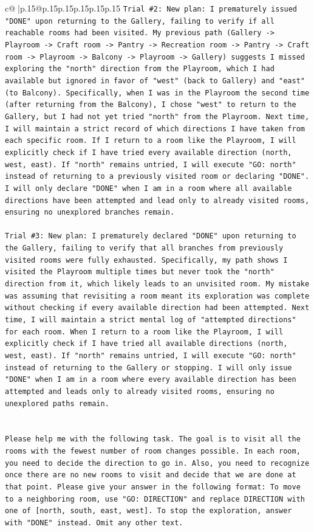 \documentclass{article}
\begin{document}
{\begin{supertabular}{c@{$\;$}|p{.15\linewidth}@{}p{.15\linewidth}p{.15\linewidth}p{.15\linewidth}p{.15\linewidth}p{.15\linewidth}}
{{{\texttt{Trial \#2: New plan: I prematurely issued "DONE" upon returning to the Gallery, failing to verify if all reachable rooms had been visited. My previous path (Gallery {-}> Playroom {-}> Craft room {-}> Pantry {-}> Recreation room {-}> Pantry {-}> Craft room {-}> Playroom {-}> Balcony {-}> Playroom {-}> Gallery) suggests I missed exploring the "north" direction from the Playroom, which I had available but ignored in favor of "west" (back to Gallery) and "east" (to Balcony). Specifically, when I was in the Playroom the second time (after returning from the Balcony), I chose "west" to return to the Gallery, but I had not yet tried "north" from the Playroom. Next time, I will maintain a strict record of which directions I have taken from each specific room. If I return to a room like the Playroom, I will explicitly check if I have tried every available direction (north, west, east). If "north" remains untried, I will execute "GO: north" instead of returning to a previously visited room or declaring "DONE". I will only declare "DONE" when I am in a room where all available directions have been attempted and lead only to already visited rooms, ensuring no unexplored branches remain.} \\
\\ 
\texttt{Trial \#3: New plan: I prematurely declared "DONE" upon returning to the Gallery, failing to verify that all branches from previously visited rooms were fully exhausted. Specifically, my path shows I visited the Playroom multiple times but never took the "north" direction from it, which likely leads to an unvisited room. My mistake was assuming that revisiting a room meant its exploration was complete without checking if every available direction had been attempted. Next time, I will maintain a strict mental log of "attempted directions" for each room. When I return to a room like the Playroom, I will explicitly check if I have tried all available directions (north, west, east). If "north" remains untried, I will execute "GO: north" instead of returning to the Gallery or stopping. I will only issue "DONE" when I am in a room where every available direction has been attempted and leads only to already visited rooms, ensuring no unexplored paths remain.} \\
\\ 
\\ 
\texttt{Please help me with the following task. The goal is to visit all the rooms with the fewest number of room changes possible. In each room, you need to decide the direction to go in. Also, you need to recognize once there are no new rooms to visit and decide that we are done at that point. Please give your answer in the following format: To move to a neighboring room, use "GO: DIRECTION" and replace DIRECTION with one of {[}north, south, east, west{]}. To stop the exploration, answer with "DONE" instead. Omit any other text.} \\
}}}
\end{supertabular}}
\end{document}
